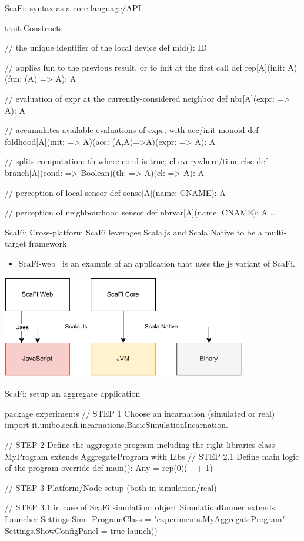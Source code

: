 \documentclass[presentation, 9pt]{beamer}\mode<presentation>{\usetheme{AMSBolognaFC}}
\begin{document}
\begin{frame}[fragile]{ScaFi: syntax as a core language/API}

	\begin{mycode}{}{}{}
trait Constructs {
	// the unique identifier of the local device 
	def mid(): ID
	
	// applies fun to the previous result, or to init at the first call
	def rep[A](init: A)(fun: (A) => A): A
	
	// evaluation of expr at the currently-considered neighbor
	def nbr[A](expr: => A): A
	
	// accumulates available evaluations of expr, with acc/init monoid
	def foldhood[A](init: => A)(acc: (A,A)=>A)(expr: => A): A
	
	// splits computation: th where cond is true, el everywhere/time else
	def branch[A](cond: => Boolean)(th: => A)(el: => A): A
	
	// perception of local sensor
	def sense[A](name: CNAME): A
	
	// perception of neighbourhood sensor
	def nbrvar[A](name: CNAME): A
	...
}
\end{mycode}
\end{frame}
\begin{frame}{ScaFi: Cross-platform}
	ScaFi leverages Scala.js and Scala Native to be a multi-target framework
	\begin{itemize}
		\item ScaFi-web~\cite{DBLP:conf/coordination/AguzziCMPV21} is an example of an application that uses the js variant of ScaFi.
	\end{itemize}
	\centering
	\includegraphics[width=0.8\textwidth]{img/multi-platform.drawio}
\end{frame}
\begin{frame}[fragile]{ScaFi: setup an aggregate application}
\begin{mycode}{}{}{}
package experiments
// STEP 1 Choose an incarnation (simulated or real)
import it.unibo.scafi.incarnations.BasicSimulationIncarnation._

// STEP 2 Define the aggregate program including the right libraries
class MyProgram extends AggregateProgram with Libs {
	// STEP 2.1 Define main logic of the program
	override def main(): Any = rep(0)(_ + 1)
}

// STEP 3 Platform/Node setup (both in simulation/real)

// STEP 3.1 in case of ScaFi simulation:
object SimulationRunner extends Launcher {
  Settings.Sim_ProgramClass = "experiments.MyAggregateProgram"
  Settings.ShowConfigPanel = true
  launch()
}
\end{mycode}
\end{frame}
\end{document}
